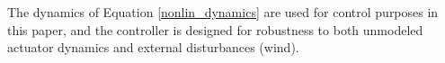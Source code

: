 \documentclass[letterpaper, 10 pt, conference]{ieeeconf}\usepackage[margin=1in]{geometry}
\begin{document}

The dynamics of Equation \ref{nonlin_dynamics} are used for control purposes in this paper, and the controller is designed for robustness to both unmodeled actuator dynamics and external disturbances (wind).
\end{document}
